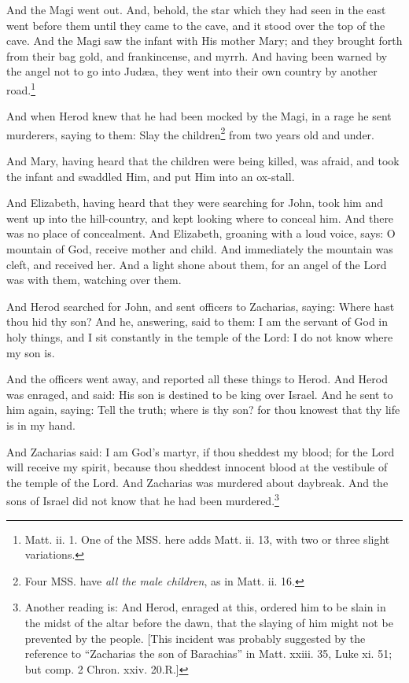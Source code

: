 \pend\pstart
And the Magi went out. And, behold, the star which they had seen in the east went before them until they came to the cave, and it stood over the top of the cave. And the Magi saw the infant with His mother Mary; and they brought forth from their bag gold, and frankincense, and myrrh. And having been warned by the angel not to go into Judæa, they went into their own country by another road.\footnote{Matt. ii. 1. One of the MSS. here adds Matt. ii. 13, with two or three slight variations.}

\pend\pstart
{}

\pend\setcounter{pstartR}{1}\pstart
And when Herod knew that he had been mocked by the Magi, in a rage he sent murderers, saying to them: Slay the children\footnote{Four MSS. have \textit{all the male children}, as in Matt. ii. 16.} from two years old and under.

\pend\pstart
And Mary, having heard that the children were being killed, was afraid, and took the infant and swaddled Him, and put Him into an ox-stall.

\pend\pstart
And Elizabeth, having heard that they were searching for John, took him and went up into the hill-country, and kept looking where to conceal him. And there was no place of concealment. And Elizabeth, groaning with a loud voice, says: O mountain of God, receive mother and child. And immediately the mountain was cleft, and received her. And a light shone about them, for an angel of the Lord was with them, watching over them.

\pend\pstart
{}

\pend\setcounter{pstartR}{1}\pstart
And Herod searched for John, and sent officers to Zacharias, saying: Where hast thou hid thy son? And he, answering, said to them: I am the servant of God in holy things, and I sit constantly in the temple of the Lord: I do not know where my son is.

\pend\pstart
And the officers went away, and reported all these things to Herod. And Herod was enraged, and said: His son is destined to be king over Israel. And he sent to him again, saying: Tell the truth; where is thy son? for thou knowest that thy life is in my hand.

\pend\pstart
And Zacharias said: I am God's martyr, if thou sheddest my blood; for the Lord will receive my spirit, because thou sheddest innocent blood at the vestibule of the temple of the Lord. And Zacharias was murdered about daybreak. And the sons of Israel did not know that he had been murdered.\footnote{Another reading is: And Herod, enraged at this, ordered him to be slain in the midst of the altar before the dawn, that the slaying of him might not be prevented by the people. [This incident was probably suggested by the reference to ``Zacharias the son of Barachias'' in Matt. xxiii. 35, Luke xi. 51; but comp. 2 Chron. xxiv. 20.\textemdash R.]}

